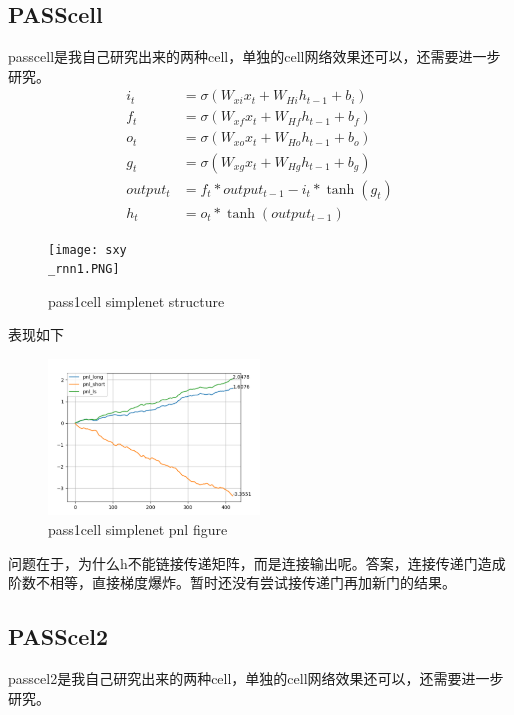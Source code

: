 \documentclass[11pt]{ctexart}
\begin{document}
\subsection{PASScell}
passcell是我自己研究出来的两种cell，单独的cell网络效果还可以，还需要进一步研究。
\begin{equation}
\begin{split}
    i_t &= \sigma (W_{x i} x_t + W_{H i} h_{t-1} + b_i)\\
    f_t &= \sigma (W_{x f} x_t + W_{H f} h_{t-1} + b_f)\\
    o_t &= \sigma (W_{x o} x_t + W_{H o} h_{t-1} + b_o)\\
    g_t &= \sigma (W_{x g} x_t + W_{H g} h_{t-1} + b_g)\\
    output_t &= f_t * output_{t-1} - i_t * \tanh(g_t)\\
    h_t &= o_t * \tanh(output_{t-1})
\end{split}
\end{equation}
\begin{figure}[!ht]
\begin{center}
\texttt{[image: sxy\\\_rnn1.PNG]}
\end{center}
\caption{pass1cell simplenet structure}
\label{FIG.7}
\end{figure}
表现如下
\begin{figure}[!ht]
\begin{center}
\includegraphics[width=0.5\textwidth]{wde.PNG}
\end{center}
\caption{pass1cell simplenet pnl figure}
\label{FIG.8}
\end{figure}

问题在于，为什么h不能链接传递矩阵，而是连接输出呢。答案，连接传递门造成阶数不相等，直接梯度爆炸。暂时还没有尝试接传递门再加新门的结果。

\subsection{PASScel2}
passcel2是我自己研究出来的两种cell，单独的cell网络效果还可以，还需要进一步研究。
\end{document}
